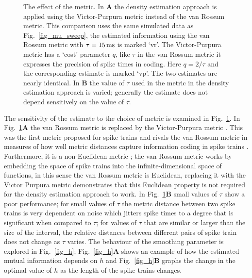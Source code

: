 \documentclass[12pt]{article}
\newcommand{\ms}{\mbox{\,ms}}
\begin{document}
\begin{figure}[tp]
\begin{center}
\begin{picture}
  \end{picture}%
\endgroup
\end{center}
\caption{The effect of the metric. In \textbf{A} the density
  estimation approach is applied using the Victor-Purpura metric
  instead of the van Rossum metric. This comparison uses the same
  simulated data as Fig.~\ref{fig_mu_sweep}, the estimated information
  using the van Rossum metric with $\tau=15\ms$ is marked
  \lq{}vr\rq{}. The Victor-Purpura metric has a \lq{}cost\rq{}
  parameter $q$, like $\tau$ in the van Rossum metric it expresses the
  precision of spike times in coding. Here $q=2/\tau$ and the
  corresponding estimate is marked \lq{}vp\rq{}. The two estimates are
  nearly identical.  In \textbf{B} the value of $\tau$ used in the
  metric in the density estimation approach is varied; generally the
  estimate does not depend sensitively on the value of $\tau$.
 \label{fig_metrics}}
\end{figure}


The sensitivity of the estimate to the choice of metric is examined in
Fig.~\ref{fig_metrics}. In Fig.~\ref{fig_metrics}\textbf{A} the van
Rossum metric is replaced by the Victor-Purpura metric
\citep{VictorPurpura1996}. This was the first metric proposed for
spike trains and rivals the van Rossum metric in measures of how well
metric distances capture information coding in spike trains
\citep{HoughtonVictor2010}. Furthermore, it is a non-Euclidean metric
\citep{AronovVictor2004}; the van Rossum metric works by embedding the
space of spike trains into the infinite-dimensional space of
functions, in this sense the van Rossum metric is Euclidean, replacing
it with the Victor Purpura metric demonstrates that this Euclidean
property is not required for the density estimation approach to
work. In Fig.~\ref{fig_metrics}\textbf{B} small values of $\tau$ show
a poor performance; for small values of $\tau$ the metric distance
between two spike trains is very dependent on noise which jitters
spike times to a degree that is significant when compared to $\tau$;
for values of $\tau$ that are similar or larger than the size of the
interval, the relative distances between different pairs of spike
train does not change as $\tau$ varies. The behaviour of the smoothing
parameter is explored in Fig.~\ref{fig_h}; Fig.~\ref{fig_h}\textbf{A}
shows an example of how the estimated mutual information depends on
$h$ and Fig.~\ref{fig_h}\textbf{B} graphs the change in the optimal
value of $h$ as the length of the spike trains changes.
\end{document}
